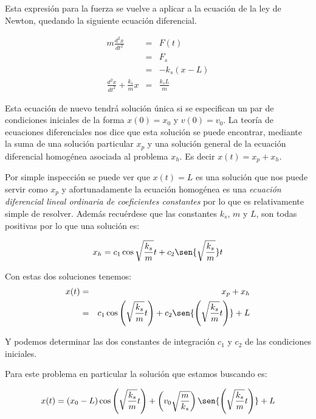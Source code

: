 Esta expresión para la fuerza se vuelve a aplicar a la ecuación de la ley de Newton, quedando la siguiente ecuación diferencial.

\begin{eqnarray}
m \frac{d^2x}{dt^2} & = & F(t) \nonumber \\
                    & = & F_s \nonumber \\
                    & = & -k_s \left( x - L \right) \nonumber \\
\frac{d^2x}{dt^2} + \frac{k_s}{m}x  & = & \frac{k_s L}{m}
\end{eqnarray}

Esta ecuación de nuevo tendrá solución única si se especifican un par de condiciones iniciales de la forma $x(0) = x_0$ y $ v(0) = v_0 $. La teoría de ecuaciones diferenciales nos dice que esta solución se puede encontrar, mediante la suma de una solución particular $x_p$ y una solución general de la ecuación diferencial homogénea asociada al problema $x_h$. Es decir $x(t) = x_p + x_h$.

Por simple inspección se puede ver que $x(t)= L$ es una solución que nos puede servir como $x_p$ y afortunadamente la ecuación homogénea  es una \emph{ecuación diferencial lineal ordinaria de coeficientes constantes} por lo que es relativamente simple de resolver. Además recuérdese que las constantes $k_s$, $m$ y $L$, son todas positivas por lo que una solución es:

\begin{equation}
x_h = c_1 \cos{\sqrt{\frac{k_s}{m}}}t + c_2 \sen{\sqrt{\frac{k_s}{m}}}t
\end{equation}

Con estas dos soluciones tenemos:
\begin{eqnarray}
x(t) & = & x_p + x_h \nonumber \\
     & = & c_1 \cos{\left(\sqrt{\frac{k_s}{m}} t \right)} + c_2 \sen{\left(\sqrt{\frac{k_s}{m}} t \right)} + L
\end{eqnarray}

Y podemos determinar las dos constantes de integración $c_1$ y $c_2$ de las condiciones iniciales.

Para este problema en particular la solución que estamos buscando es:

\begin{equation}
x(t) = \left(x_0 - L \right) \cos{\left(\sqrt{\frac{k_s}{m}} t \right)} +  \left( v_0 \sqrt{\frac{m}{k_s}}\right) \sen{\left(\sqrt{\frac{k_s}{m}} t \right)} + L
\end{equation}


